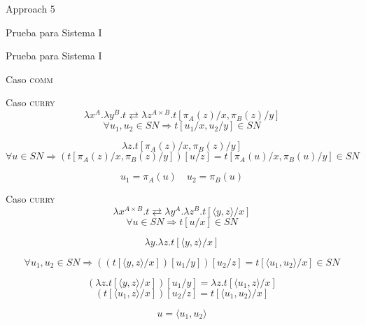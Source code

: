 \begin{frame}{Approach 5}
\end{frame}

\begin{frame}{Prueba para Sistema I}
	\pause
\end{frame}

\begin{frame}{Prueba para Sistema I}
\end{frame}

\begin{frame}{Caso \textsc{comm}}
\end{frame}

\begin{frame}{Caso \textsc{curry}}
	\[ \lambda x^A. \lambda y^B. t \rightleftarrows \lambda z^{A \times B}. t[\pi_A(z)/x, \pi_B(z)/y] \]
	\[ \forall u_1, u_2 \in SN \Longrightarrow t[u_1/x, u_2/y] \in SN \]
	
	\[ \lambda z. t[\pi_A(z)/x, \pi_B(z)/y]\]
	\[ \forall u \in SN \Longrightarrow (t[\pi_A(z)/x, \pi_B(z)/y])[u/z] = t[\pi_A(u)/x, \pi_B(u)/y] \in SN \]
	 
	\[ u_1 = \pi_A(u) \quad u_2 = \pi_B(u) \]
\end{frame}

\begin{frame}{Caso \textsc{curry}}
	\[ \lambda x^{A \times B}. t \rightleftarrows \lambda y^A. \lambda z^B. t[\langle y, z \rangle/x] \]
	\[ \forall u \in SN \Longrightarrow t[u/x] \in SN \]
	
	\[ \lambda y. \lambda z. t[\langle y, z \rangle/x]\]
	
	\[ \forall u_1,u_2 \in SN \Longrightarrow ((t[\langle y, z \rangle/x])[u_1/y])[u_2/z] = t[\langle u_1, u_2 \rangle/x] \in SN \]
	
	\[ (\lambda z. t[\langle y, z \rangle/x])[u_1/y] = \lambda z. t[\langle u_1, z \rangle/x] \]
	\[ (t[\langle u_1, z \rangle/x])[u_2/z] = t[\langle u_1, u_2 \rangle/x] \]
	
	\[ u = \langle u_1, u_2 \rangle \]
\end{frame}
